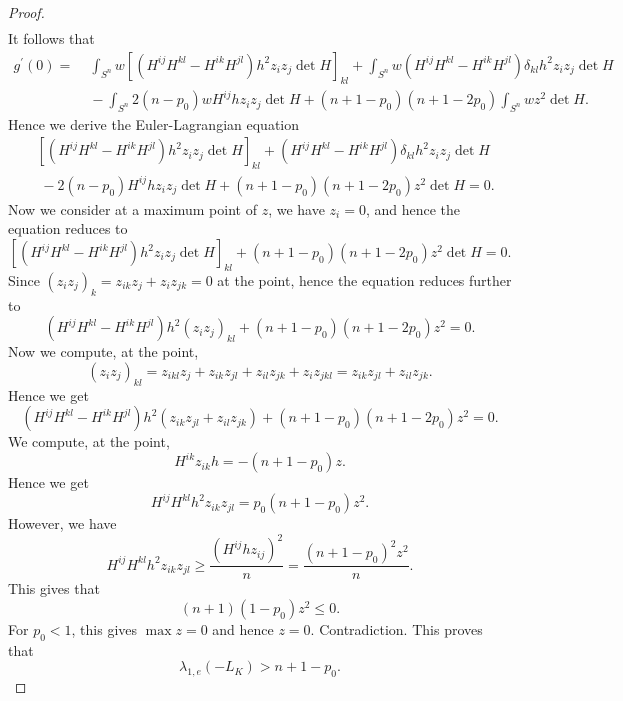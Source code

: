 \documentclass[reqno]{amsart}
\theoremstyle{remark}
\theoremstyle{plain}
\begin{document}
\begin{proof}
\begin{equation}
\begin{split}
    \end{split}
\end{equation}
It follows that
\begin{equation}
\begin{split}
      g^{'}(0)=&\;\int_{S^n} w \left[(H^{ij}H^{kl}-H^{ik}H^{jl})h^2 z_iz_j\det{H}\right]_{kl}+\int_{S^n} w (H^{ij}H^{kl}-H^{ik}H^{jl})\delta_{kl}h^2z_iz_j\det{H}\\
      &\;-\int_{S^{n}} 2(n-p_0) w H^{ij}hz_iz_j\det{H}+(n+1-p_0)(n+1-2p_0)\int_{S^n} wz^2 \det{H}.
\end{split}
\end{equation}
Hence we derive the Euler-Lagrangian equation 
\begin{equation}
\begin{split}
    &\left[(H^{ij}H^{kl}-H^{ik}H^{jl})h^2 z_iz_j\det{H}\right]_{kl}+(H^{ij}H^{kl}-H^{ik}H^{jl})\delta_{kl}h^2z_iz_j\det{H}\\&\;-2(n-p_0)  H^{ij}hz_iz_j\det{H}
    +(n+1-p_0)(n+1-2p_0) z^2\det{H}=0.
    \end{split}
\end{equation}
Now we consider at a maximum point of $z$, we have $z_i=0$, and hence the equation reduces to 
\begin{equation}
    \left[(H^{ij}H^{kl}-H^{ik}H^{jl})h^2 z_iz_j\det{H}\right]_{kl}+(n+1-p_0)(n+1-2p_0) z^2\det{H}=0.
\end{equation}
Since $(z_iz_j)_k=z_{ik}z_j+z_{i}z_{jk}=0$ at the point, hence the equation reduces further to
\begin{equation}
    (H^{ij}H^{kl}-H^{ik}H^{jl})h^2 (z_iz_j)_{kl}+(n+1-p_0)(n+1-2p_0) z^2=0.
\end{equation}
Now we compute, at the point, 
\[
(z_iz_j)_{kl}=z_{ikl}z_j+z_{ik}z_{jl}+z_{il}z_{jk}+z_iz_{jkl}=z_{ik}z_{jl}+z_{il}z_{jk}.
\]
Hence we get 
\[
(H^{ij}H^{kl}-H^{ik}H^{jl})h^2 (z_{ik}z_{jl}+z_{il}z_{jk})+(n+1-p_0)(n+1-2p_0) z^2=0.
\]
We compute, at the point, 
\[
H^{ik}z_{ik}h=-(n+1-p_0)z.
\]
Hence we get
\[
H^{ij}H^{kl}h^2 z_{ik}z_{jl}=p_0(n+1-p_0)z^2.
\]
However, we have
\[
H^{ij}H^{kl}h^2 z_{ik}z_{jl}\geq \frac{(H^{ij}hz_{ij})^2}{n}=\frac{(n+1-p_0)^2z^2}{n}.
\]
This gives that
\[
(n+1)(1-p_0)z^2\leq 0.
\]
 For $p_0<1$, this gives $\max z=0$ and hence $z=0$. Contradiction. This proves that 
 \[
 \lambda_{1, e}(-L_K)>n+1-p_0.
 \]
 \end{proof}
\end{document}
